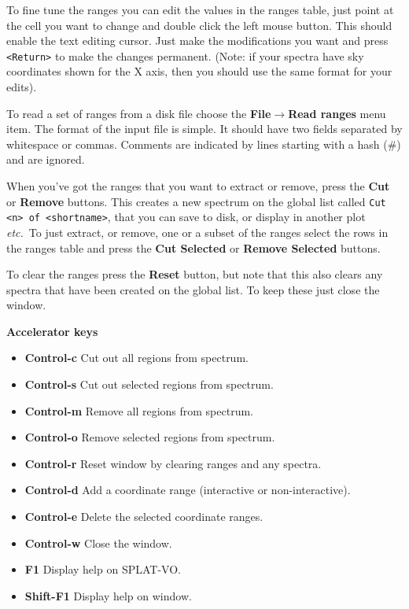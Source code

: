 \documentclass[twoside,11pt]{article}
\newcommand{\latexhtml}[2]{#1}
\renewcommand{\_}{\texttt{\symbol{95}}}
\newcommand{\SPLAT}{\textsf{SPLAT-VO}}
\newcommand{\submenuitem}[2]{\latexhtml{\textbf{#1$\rightarrow$#2}}{\textbf{#1->#2}}}
\newcommand{\labelitem}[1]{\textbf{#1}}
\newcommand{\hitext}[1]{\texttt{#1}}
\newcommand{\etc}{\textit{etc.}}
\newcommand{\subheading}[1]{\textbf{\large{#1}}}
\begin{document}
To fine tune the ranges you can edit the values in the ranges table,
just point at the cell you want to change and double click the left
mouse button. This should enable the text editing cursor. Just make
the modifications you want and press \hitext{<Return>} to make the
changes permanent. (Note: if your spectra have sky coordinates shown
for the X axis, then you should use the same format for your edits).

To read a set of ranges from a disk file choose the
\submenuitem{File}{Read ranges} menu item. The format of the input file
is simple. It should have two fields separated by whitespace or
commas. Comments are indicated by lines starting with a hash (\#)
and are ignored.

When you've got the ranges that you want to extract or remove, press the
\labelitem{Cut} or \labelitem{Remove} buttons. This creates a new
spectrum on the global list called \hitext{Cut <n> of <shortname>},
that you can save to disk, or display in another plot \etc\ To just
extract, or remove, one or a subset of the ranges select the rows in
the ranges table and press the \labelitem{Cut Selected} or
\labelitem{Remove Selected} buttons.

To clear the ranges press the \labelitem{Reset} button, but note that
this also clears any spectra that have been created on the global
list. To keep these just close the window.

\subheading{Accelerator keys}

\begin{itemize}
\item \labelitem{Control-c} Cut out all regions from spectrum.
\item \labelitem{Control-s} Cut out selected regions from spectrum.
\item \labelitem{Control-m} Remove all regions from spectrum.
\item \labelitem{Control-o} Remove selected regions from spectrum.
\item \labelitem{Control-r} Reset window by clearing ranges and any spectra.

\item \labelitem{Control-d} Add a coordinate range (interactive or non-interactive).
\item \labelitem{Control-e} Delete the selected coordinate ranges.

\item \labelitem{Control-w} Close the window.
\item \labelitem{F1} Display help on \SPLAT.     
\item \labelitem{Shift-F1} Display help on window.
\end{itemize}
\end{document}
